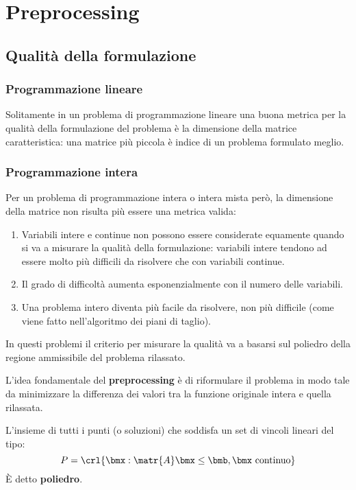 \documentclass[\main/main.tex]{subfiles}
\begin{document}
\chapter{Preprocessing}
\section{Qualità della formulazione}
\subsection{Programmazione lineare}
Solitamente in un problema di programmazione lineare una buona metrica per la qualità della formulazione del problema è la dimensione della matrice caratteristica: una matrice più piccola è indice di un problema formulato meglio.

\subsection{Programmazione intera}
Per un problema di programmazione intera o intera mista però, la dimensione della matrice non risulta più essere una metrica valida:
\begin{enumerate}
    \item Variabili intere e continue non possono essere considerate equamente quando si va a misurare la qualità della formulazione: variabili intere tendono ad essere molto più difficili da risolvere che con variabili continue.
    \item Il grado di difficoltà aumenta esponenzialmente con il numero delle variabili.
    \item Una problema intero diventa più facile da risolvere, non più difficile (come viene fatto nell'algoritmo dei piani di taglio).
\end{enumerate}

In questi problemi il criterio per misurare la qualità va a basarsi sul poliedro della regione ammissibile del problema rilassato.

L'idea fondamentale del \textbf{preprocessing} è di riformulare il problema in modo tale da minimizzare la differenza dei valori tra la funzione originale intera e quella rilassata.

\begin{definition}[Poliedro]
    L'insieme di tutti i punti (o soluzioni) che soddisfa un set di vincoli lineari del tipo:
    \[
        P = \crl{\bmx: \matr{A}\bmx \leq \bmb, \bmx \text{ continuo}}
    \]    È detto \textbf{poliedro}.
\end{definition}
\end{document}
